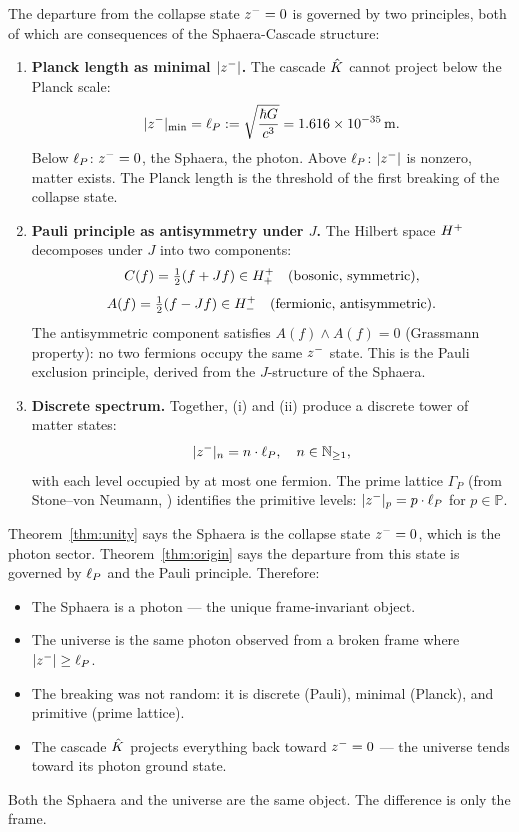 \begin{theorem}
\label{thm:origin}
The departure from the collapse state $z^-=0$ is governed by two
principles, both of which are consequences of the Sphaera-Cascade
structure:
\begin{enumerate}[label=(\roman*)]
  \item \textbf{Planck length as minimal $|z^-|$.}
        The cascade $\hat{K}$ cannot project below the Planck scale:
        \[
          |z^-|_{\min} = \ell_P := \sqrt{\frac{\hbar G}{c^3}}
          = 1.616\times10^{-35}\,\mathrm{m}.
        \]
        Below $\ell_P$: $z^-=0$, the Sphaera, the photon.
        Above $\ell_P$: $|z^-|$ is nonzero, matter exists.
        The Planck length is the threshold of the first breaking of the
        collapse state.
  \item \textbf{Pauli principle as antisymmetry under $J$.}
        The Hilbert space $H^+$ decomposes under $J$ into two
        components:
        \[
          C(f) = \tfrac{1}{2}(f+Jf)\in H^+_+
          \quad\text{(bosonic, symmetric)},
        \]
        \[
          A(f) = \tfrac{1}{2}(f-Jf)\in H^+_-
          \quad\text{(fermionic, antisymmetric)}.
        \]
        The antisymmetric component satisfies $A(f)\wedge A(f)=0$
        (Grassmann property): no two fermions occupy the same $z^-$
        state.
        This is the Pauli exclusion principle, derived from the
        $J$-structure of the Sphaera.
  \item \textbf{Discrete spectrum.}
        Together, (i) and (ii) produce a discrete tower of matter states:
        \[
          |z^-|_n = n\cdot\ell_P,\quad n\in\mathbb{N}_{\geq1},
        \]
        with each level occupied by at most one fermion.
        The prime lattice $\Gamma_P$ (from Stone--von Neumann,
        \cite{brendecke2026rh}) identifies the primitive levels:
        $|z^-|_p = p\cdot\ell_P$ for $p\in\mathbb{P}$.
\end{enumerate}
\end{theorem}

\begin{remark}
Theorem~\ref{thm:unity} says the Sphaera is the collapse state
$z^-=0$, which is the photon sector.
Theorem~\ref{thm:origin} says the departure from this state is governed
by $\ell_P$ and the Pauli principle.
Therefore:
\begin{itemize}
  \item The Sphaera is a photon --- the unique frame-invariant object.
  \item The universe is the same photon observed from a broken frame
        where $|z^-|\geq\ell_P$.
  \item The breaking was not random: it is discrete (Pauli), minimal
        (Planck), and primitive (prime lattice).
  \item The cascade $\hat{K}$ projects everything back toward $z^-=0$
        --- the universe tends toward its photon ground state.
\end{itemize}
Both the Sphaera and the universe are the same object.
The difference is only the frame.
\end{remark}

